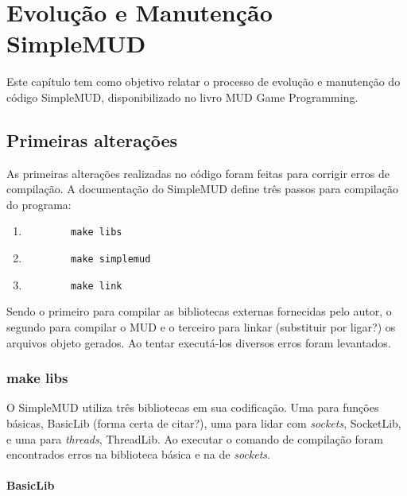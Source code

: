 \chapter[Evolução e Manutenção SimpleMUD]{Evolução e Manutenção SimpleMUD}

Este capítulo tem como objetivo relatar o processo de evolução e manutenção do código SimpleMUD, 
disponibilizado no livro MUD Game Programming.

\section{Primeiras alterações}

As primeiras alterações realizadas no código foram feitas para corrigir erros de compilação. 
A documentação do SimpleMUD define três passos para compilação do programa:

\begin{enumerate}
    \item \begin{lstlisting}
        make libs
    \end{lstlisting}
    \item \begin{lstlisting}
        make simplemud
    \end{lstlisting}
    \item \begin{lstlisting}
        make link
    \end{lstlisting}
\end{enumerate}

Sendo o primeiro para compilar as bibliotecas externas fornecidas pelo autor, 
o segundo para compilar o MUD e o terceiro para linkar (substituir por ligar?) 
os arquivos objeto gerados. Ao tentar executá-los diversos erros foram levantados.

\subsection{make libs}

O SimpleMUD utiliza três bibliotecas em sua codificação. 
Uma para funções básicas, BasicLib (forma certa de citar?), uma para lidar com \textit{sockets}, 
SocketLib, e uma para \textit{threads}, ThreadLib. Ao executar o comando de compilação 
foram encontrados erros na biblioteca básica e na de \textit{sockets}.

\subsubsection{BasicLib}

